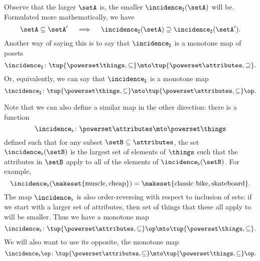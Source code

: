 Observe that the larger $\setA$ is, the smaller $\incidence_\sharp(\setA)$ will be. Formulated more mathematically, we have
\begin{equation}\label{eq:fca-example-pushforward-7}
\setA \subseteq \setA' \quad \implies \quad \incidence_\sharp(\setA) \supseteq \incidence_\sharp(\setA').
\end{equation}
Another way of saying this is to say that $\incidence_\sharp$ is a monotone map of posets 
\begin{equation}\label{eq:fca-example-pushforward-8}
\incidence_\sharp \colon \tup{\powerset \things, \subseteq} \mto \tup{\powerset \attributes, \supseteq}. 
\end{equation}
Or, equivalently, we can say that $\incidence_\sharp$ is a monotone map
\begin{equation}\label{eq:fca-example-pushforward-9}
\incidence_\sharp \colon \tup{\powerset \things, \subseteq} \mto \tup{\powerset \attributes, \subseteq}\op. 
\end{equation}

Note that we can also define a similar map in the other direction: there is a function
\begin{equation}\label{eq:fca-example-pullback-1}
\incidence_\flat \colon \powerset \attributes \mto \powerset \things
\end{equation}
defined such that for any subset $\setB \subseteq \attributes$, the set $\incidence_\flat(\setB)$ is the largest set of elements of $\things$ such that the attributes in $\setB$ apply to all of the elements of $\incidence_\flat(\setB)$. 
For example, 
\begin{equation}\label{eq:fca-example-pullback-2}
\incidence_\flat(\makeset{\text{muscle}, \text{cheap}}) = \makeset{\text{classic bike}, \text{skateboard}}.
\end{equation}
The map $\incidence_\flat$  is also order-reversing with respect to inclusion of sets: if we start with a larger set of attributes, then set of things that these all apply to will be smaller. Thus we have a monotone map 
\begin{equation}\label{eq:fca-example-pullback-3}
\incidence_\flat \colon \tup{\powerset \attributes, \subseteq}\op \mto \tup{\powerset \things, \subseteq}.
\end{equation}
We will also want to use its opposite, the monotone map
\begin{equation}\label{eq:fca-example-pullback-4}
\incidence_\flat\op \colon \tup{\powerset \attributes, \subseteq} \mto \tup{\powerset \things, \subseteq}\op.
\end{equation}

